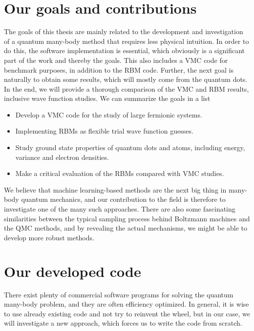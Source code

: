 \section{Our goals and contributions} \label{sec:goals}
The goals of this thesis are mainly related to the development and investigation of a quantum many-body method that requires less physical intuition. In order to do this, the software implementation is essential, which obviously is a significant part of the work and thereby the goals. This also includes a VMC code for benchmark purposes, in addition to the RBM code. Further, the next goal is naturally to obtain some results, which will mostly come from the quantum dots. In the end, we will provide a thorough comparison of the VMC and RBM results, inclusive wave function studies. We can summarize the goals in a list
\begin{itemize}
	\item Develop a VMC code for the study of large fermionic systems.
	\item Implementing RBMs as flexible trial wave function guesses.
	\item Study ground state properties of quantum dots and atoms, including energy, variance and electron densities.
	\item Make a critical evaluation of the RBMs compared with VMC studies.
\end{itemize}

We believe that machine learning-based methods are the next big thing in many-body quantum mechanics, and our contribution to the field is therefore to investigate one of the many such approaches. There are also some fascinating similarities between the typical sampling process behind Boltzmann machines and the QMC methods, and by revealing the actual mechanisms, we might be able to develop more robust methods. 

\section{Our developed code}
There exist plenty of commercial software programs for solving the quantum many-body problem, and they are often efficiency optimized. In general, it is wise to use already existing code and not try to reinvent the wheel, but in our case, we will investigate a new approach, which forces us to write the code from scratch. 

